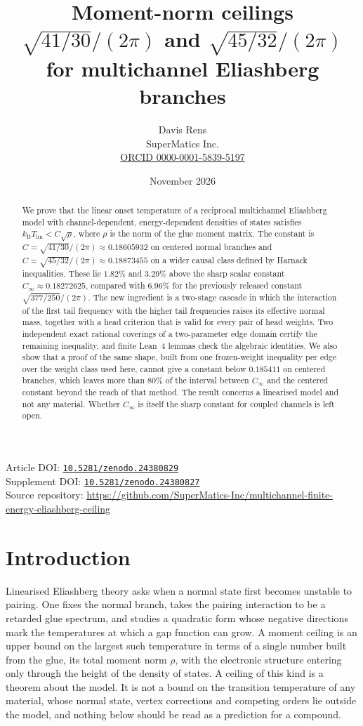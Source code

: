 \documentclass[10pt]{article}
\title{Moment-norm ceilings $\sqrt{41/30}/(2\pi)$ and $\sqrt{45/32}/(2\pi)$\\ for multichannel Eliashberg branches}
\author{Davis Rens\\SuperMatics Inc.\\\href{https://orcid.org/0000-0001-5839-5197}{ORCID 0000-0001-5839-5197}}
\date{November 2026}
\theoremstyle{remark}
\newcommand{\DOI}[1]{\href{https://doi.org/#1}{\nolinkurl{#1}}}
\newcommand{\kB}{k_{\mathrm B}}
\newcommand{\Tlin}{T_{\mathrm{lin}}}
\newcommand{\Cinf}{C_\infty}
\begin{document}
\maketitle

\begin{abstract}
We prove that the linear onset temperature of a reciprocal multichannel Eliashberg model with channel-dependent, energy-dependent densities of states satisfies $\kB\Tlin<C\sqrt{\rho}$, where $\rho$ is the norm of the glue moment matrix. The constant is $C=\sqrt{41/30}/(2\pi)\approx0.18605932$ on centered normal branches and $C=\sqrt{45/32}/(2\pi)\approx0.18873455$ on a wider causal class defined by Harnack inequalities. These lie $1.82\%$ and $3.29\%$ above the sharp scalar constant $\Cinf\approx0.18272625$, compared with $6.96\%$ for the previously released constant $\sqrt{377/250}/(2\pi)$. The new ingredient is a two-stage cascade in which the interaction of the first tail frequency with the higher tail frequencies raises its effective normal mass, together with a head criterion that is valid for every pair of head weights. Two independent exact rational coverings of a two-parameter edge domain certify the remaining inequality, and finite Lean~4 lemmas check the algebraic identities. We also show that a proof of the same shape, built from one frozen-weight inequality per edge over the weight class used here, cannot give a constant below $0.185411$ on centered branches, which leaves more than $80\%$ of the interval between $\Cinf$ and the centered constant beyond the reach of that method. The result concerns a linearised model and not any material. Whether $\Cinf$ is itself the sharp constant for coupled channels is left open.
\end{abstract}

\begin{center}\small
Article DOI: \DOI{10.5281/zenodo.24380829}\\
Supplement DOI: \DOI{10.5281/zenodo.24380827}\\
Source repository: \url{https://github.com/SuperMatics-Inc/multichannel-finite-energy-eliashberg-ceiling}
\end{center}

\section{Introduction}

Linearised Eliashberg theory asks when a normal state first becomes unstable to pairing. One fixes the normal branch, takes the pairing interaction to be a retarded glue spectrum, and studies a quadratic form whose negative directions mark the temperatures at which a gap function can grow. A moment ceiling is an upper bound on the largest such temperature in terms of a single number built from the glue, its total moment norm $\rho$, with the electronic structure entering only through the height of the density of states. A ceiling of this kind is a theorem about the model. It is not a bound on the transition temperature of any material, whose normal state, vertex corrections and competing orders lie outside the model, and nothing below should be read as a prediction for a compound.
\end{document}

